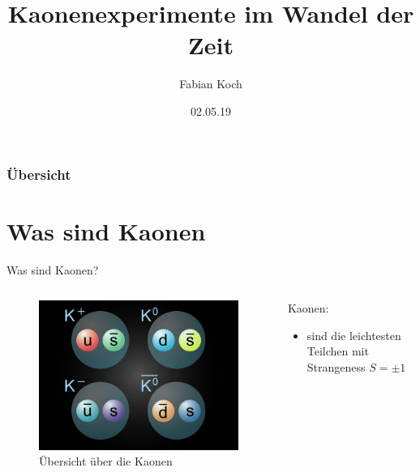\documentclass[aspectratio=1610, professionalfonts, 9pt, t]{beamer}
\title{Kaonenexperimente im Wandel der Zeit}
\author[F.~Koch]{Fabian Koch}
\date{02.05.19}
\institute[Fakultät Physik ]{Fakultät Physik}
\begin{document}


\maketitle

\begin{frame}
  \frametitle{Übersicht}
  \tableofcontents
\end{frame}


\section{Was sind Kaonen}
  \begin{frame}{Was sind Kaonen?}
    \begin{columns}[onlytextwidth]
      \begin{column}{0.4\textwidth}
        \begin{figure}[ht]
          \begin{center}
            \includegraphics[height=0.6\textheight]{Images/Kaonen.png}
            \caption{Übersicht über die Kaonen}
          \end{center}
        \end{figure}
      \end{column}
      \begin{column}{0.5\textwidth}
        Kaonen:
        \begin{itemize}
          \item sind die leichtesten Teilchen mit Strangeness $S = \pm1$

\end{itemize}
\end{column}
\end{columns}
\end{frame}
\end{document}
